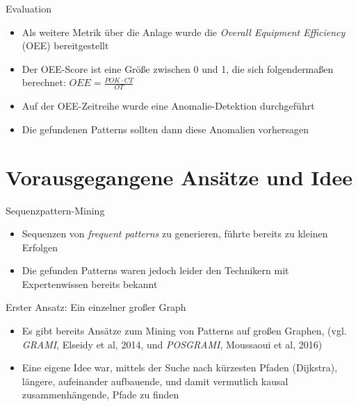 \documentclass{beamer}
\begin{document}
\begin{frame}{Evaluation}
\begin{itemize}
    \item Als weitere Metrik über die Anlage wurde die \textit{Overall Equipment Efficiency} (OEE) bereitgestellt
    \item Der OEE-Score ist eine Größe zwischen 0 und 1, die sich folgendermaßen berechnet: $OEE = \frac{POK \cdot CT}{OT}$
    \item Auf der OEE-Zeitreihe wurde eine Anomalie-Detektion durchgeführt
    \item Die gefundenen Patterns sollten dann diese Anomalien vorhersagen
\end{itemize}
\end{frame}

  \section{Vorausgegangene Ansätze und Idee}
\begin{frame}{Sequenzpattern-Mining}
\begin{itemize}
    \item Sequenzen von \textit{frequent patterns} zu generieren, führte bereits zu kleinen Erfolgen
    \item Die gefunden Patterns waren jedoch leider den Technikern mit Expertenwissen bereits bekannt
\end{itemize}
\end{frame}

\begin{frame}{Erster Ansatz: Ein einzelner großer Graph}
\begin{itemize}
    \item Es gibt bereits Ansätze zum Mining von Patterns auf großen Graphen, (vgl. \textit{GRAMI}, Elseidy et al, 2014, und \textit{POSGRAMI}, Moussaoui et al, 2016)
    \item Eine eigene Idee war, mittels der Suche nach kürzesten Pfaden (Dijkstra), längere, aufeinander aufbauende, und damit vermutlich kausal zusammenhängende, Pfade zu finden
\end{itemize}
\end{frame}
\end{document}
